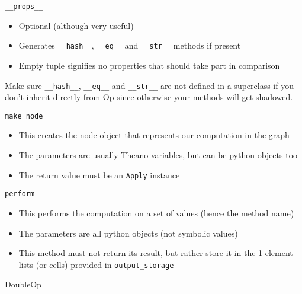 \documentclass[utf8x]{beamer}
\newcommand{\code}[1]{\lstinline[emph={[2]}]|#1|}
\begin{document}
\begin{frame}{\code{__props__}}

\begin{itemize}
\item Optional (although very useful)
\item Generates \code{__hash__}, \code{__eq__} and \code{__str__} methods if present
\item Empty tuple signifies no properties that should take part in comparison
\end{itemize}
\begin{alertblock}{}
Make sure \code{__hash__}, \code{__eq__} and \code{__str__} are not defined in a superclass if you don't inherit directly from Op since otherwise your methods will get shadowed.
\end{alertblock}
\end{frame}

\begin{frame}{\code{make_node}}

\begin{itemize}
\item This creates the node object that represents our computation in the graph
\item The parameters are usually Theano variables, but can be python objects too
\item The return value must be an \code{Apply} instance
\end{itemize}
\end{frame}

\begin{frame}{\code{perform}}

\begin{itemize}
\item This performs the computation on a set of values (hence the method name)
\item The parameters are all python objects (not symbolic values)
\item This method must not return its result, but rather store it in the 1-element lists (or cells) provided in \code{output_storage}
\end{itemize}
\end{frame}

\begin{frame}{DoubleOp}

\end{frame}

\end{document}

